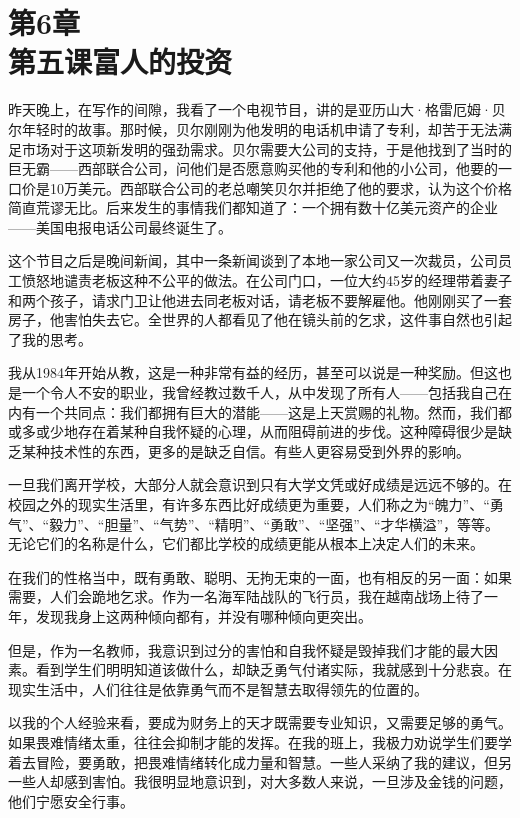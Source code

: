 \section[第6章\q 第五课\q 富人的投资]{第6章\\第五课\q 富人的投资}

昨天晚上，在写作的间隙，我看了一个电视节目，讲的是亚历山大·格雷厄姆·贝尔年轻时的故事。那时候，贝尔刚刚为他发明的电话机申请了专利，却苦于无法满足市场对于这项新发明的强劲需求。贝尔需要大公司的支持，于是他找到了当时的巨无霸——西部联合公司，问他们是否愿意购买他的专利和他的小公司，他要的一口价是10万美元。西部联合公司的老总嘲笑贝尔并拒绝了他的要求，认为这个价格简直荒谬无比。后来发生的事情我们都知道了：一个拥有数十亿美元资产的企业——美国电报电话公司最终诞生了。

这个节目之后是晚间新闻，其中一条新闻谈到了本地一家公司又一次裁员，公司员工愤怒地谴责老板这种不公平的做法。在公司门口，一位大约45岁的经理带着妻子和两个孩子，请求门卫让他进去同老板对话，请老板不要解雇他。他刚刚买了一套房子，他害怕失去它。全世界的人都看见了他在镜头前的乞求，这件事自然也引起了我的思考。

我从1984年开始从教，这是一种非常有益的经历，甚至可以说是一种奖励。但这也是一个令人不安的职业，我曾经教过数千人，从中发现了所有人——包括我自己在内有一个共同点：我们都拥有巨大的潜能——这是上天赏赐的礼物。然而，我们都或多或少地存在着某种自我怀疑的心理，从而阻碍前进的步伐。这种障碍很少是缺乏某种技术性的东西，更多的是缺乏自信。有些人更容易受到外界的影响。

一旦我们离开学校，大部分人就会意识到只有大学文凭或好成绩是远远不够的。在校园之外的现实生活里，有许多东西比好成绩更为重要，人们称之为“魄力”、“勇气”、“毅力”、“胆量”、“气势”、“精明”、“勇敢”、“坚强”、“才华横溢”，等等。无论它们的名称是什么，它们都比学校的成绩更能从根本上决定人们的未来。

在我们的性格当中，既有勇敢、聪明、无拘无束的一面，也有相反的另一面：如果需要，人们会跪地乞求。作为一名海军陆战队的飞行员，我在越南战场上待了一年，发现我身上这两种倾向都有，并没有哪种倾向更突出。

但是，作为一名教师，我意识到过分的害怕和自我怀疑是毁掉我们才能的最大因素。看到学生们明明知道该做什么，却缺乏勇气付诸实际，我就感到十分悲哀。在现实生活中，人们往往是依靠勇气而不是智慧去取得领先的位置的。

以我的个人经验来看，要成为财务上的天才既需要专业知识，又需要足够的勇气。如果畏难情绪太重，往往会抑制才能的发挥。在我的班上，我极力劝说学生们要学着去冒险，要勇敢，把畏难情绪转化成力量和智慧。一些人采纳了我的建议，但另一些人却感到害怕。我很明显地意识到，对大多数人来说，一旦涉及金钱的问题，他们宁愿安全行事。

